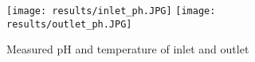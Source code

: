 \begin{figure}[H]
\centering

\texttt{[image: results/inlet\_ph.JPG]}\hfill
\texttt{[image: results/outlet\_ph.JPG]}\hfill

\caption{Measured pH and temperature of inlet and outlet}
\label{fig: pH and temperature}
\end{figure}
